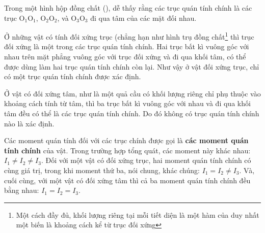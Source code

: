 Trong một hình hộp đồng chất (), dễ thấy rằng các trục quán tính chính là các trục O$_1$O$_1$, O$_2$O$_2$, và O$_3$O$_3$ đi qua tâm của các mặt đối nhau.

Ở những vật có tính đối xứng trục (chẳng hạn như hình trụ đồng chất\footnote{Một cách đầy đủ, khối lượng riêng tại mỗi tiết diện là một hàm của duy nhất một biến là khoảng cách kể từ trục đối xứng} thì trục đối xứng là một trong các trục quán tính chính. Hai trục bất kì vuông góc với nhau trên mặt phẳng vuông góc với trục đối xứng và đi qua khối tâm, có thể được dùng làm hai trục quán tính chính còn lại. Như vậy ở vật đối xứng trục, chỉ có một trục quán tính chính được xác định.

Ở vật có đối xứng tâm, như là một quả cầu có khối lượng riêng chỉ phụ thuộc vào khoảng cách tính từ tâm, thì ba trục bất kì vuông góc với nhau và đi qua khối tâm đều có thể là các trục quán tính chính. Do đó không có trục quán tính chính nào là xác định.

Các moment quán tính đối với các trục chính được gọi là \textbf{các moment quán tính chính} của vật. Trong trường hợp tổng quát, các moment này khác nhau: $I_1\neq I_2\neq I_3$. Đối với một vật có đối xứng trục, hai moment quán tính chính có cùng giá trị, trong khi moment thứ ba, nói chung, khác chúng: $I_1=I_2\neq I_3$. Và, cuối cùng, với một vật có đối xứng tâm thì cả ba moment quán tính chính đều bằng nhau: $I_1=I_2=I_3$.

